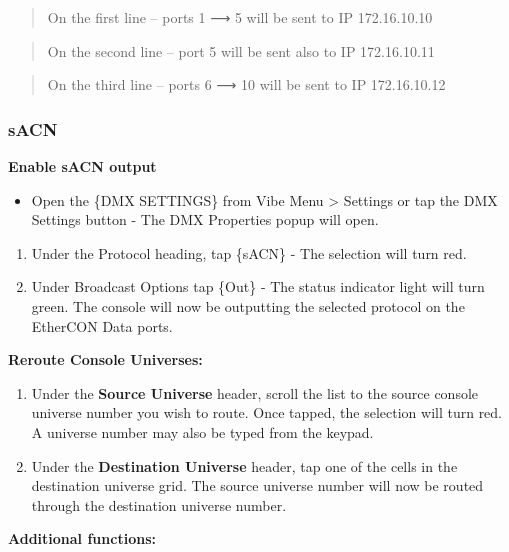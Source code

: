 \documentclass[
]{article}
\providecommand{\tightlist}{%
  \setlength{\itemsep}{0pt}\setlength{\parskip}{0pt}}
\begin{document}
\begin{quote}
On the first line -- ports 1 ⟶ 5 will be sent to IP 172.16.10.10
\end{quote}

\begin{quote}
On the second line -- port 5 will be sent also to IP 172.16.10.11
\end{quote}

\begin{quote}
On the third line -- ports 6 ⟶ 10 will be sent to IP 172.16.10.12
\end{quote}

\hypertarget{sacn}{%
\subsubsection{sACN}\label{sacn}}

\textbf{Enable sACN output}

\begin{itemize}
\tightlist
\item
  Open the \{DMX SETTINGS\} from Vibe Menu \textgreater{} Settings or tap the DMX Settings button - The DMX Properties popup will open.
\end{itemize}

\begin{enumerate}
\def\labelenumi{\arabic{enumi}.}
\item
  Under the Protocol heading, tap \{sACN\} - The selection will turn red.
\item
  Under Broadcast Options tap \{Out\} - The status indicator light will turn green. The console will now be outputting the selected protocol on the EtherCON Data ports.
\end{enumerate}

\textbf{Reroute Console Universes:}

\begin{enumerate}
\def\labelenumi{\arabic{enumi}.}
\item
  Under the \textbf{Source Universe} header, scroll the list to the source console universe number you wish to route. Once tapped, the selection will turn red. A universe number may also be typed from the keypad.
\item
  Under the \textbf{Destination Universe} header, tap one of the cells in the destination universe grid. The source universe number will now be routed through the destination universe number.
\end{enumerate}

\textbf{Additional functions:}
\end{document}
